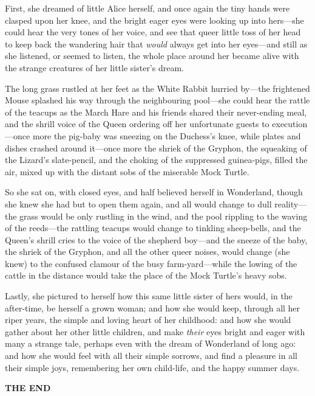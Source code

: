 \documentclass[book, 20pt]{extbook}
\begin{document}
First, she dreamed of little Alice herself, and once again the tiny
hands were clasped upon her knee, and the bright eager eyes were looking
up into hers---she could hear the very tones of her voice, and see that
queer little toss of her head to keep back the wandering hair that
\emph{would} always get into her eyes---and still as she listened, or
seemed to listen, the whole place around her became alive with the
strange creatures of her little sister's dream.

The long grass rustled at her feet as the White Rabbit hurried by---the
frightened Mouse splashed his way through the neighbouring pool---she
could hear the rattle of the teacups as the March Hare and his friends
shared their never-ending meal, and the shrill voice of the Queen
ordering off her unfortunate guests to execution---once more the
pig-baby was sneezing on the Duchess's knee, while plates and dishes
crashed around it---once more the shriek of the Gryphon, the squeaking
of the Lizard's slate-pencil, and the choking of the suppressed
guinea-pigs, filled the air, mixed up with the distant sobs of the
miserable Mock Turtle.

So she sat on, with closed eyes, and half believed herself in
Wonderland, though she knew she had but to open them again, and all
would change to dull reality---the grass would be only rustling in the
wind, and the pool rippling to the waving of the reeds---the rattling
teacups would change to tinkling sheep-bells, and the Queen's shrill
cries to the voice of the shepherd boy---and the sneeze of the baby, the
shriek of the Gryphon, and all the other queer noises, would change (she
knew) to the confused clamour of the busy farm-yard---while the lowing
of the cattle in the distance would take the place of the Mock Turtle's
heavy sobs.

Lastly, she pictured to herself how this same little sister of hers
would, in the after-time, be herself a grown woman; and how she would
keep, through all her riper years, the simple and loving heart of her
childhood: and how she would gather about her other little children, and
make \emph{their} eyes bright and eager with many a strange tale,
perhaps even with the dream of Wonderland of long ago: and how she would
feel with all their simple sorrows, and find a pleasure in all their
simple joys, remembering her own child-life, and the happy summer days.

\begin{center}
{\textbf{THE END}}
\end{center}
\end{document}
